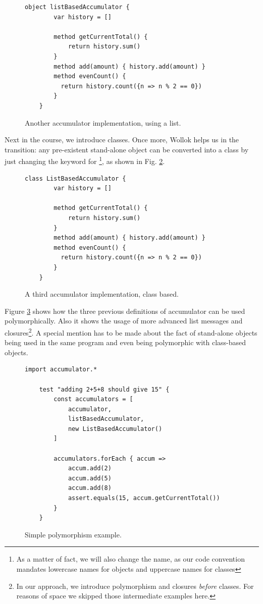 \begin{figure}[ht]
 \centering
 \begin{lstlisting}[language=Wollok]
	object listBasedAccumulator {
		var history = []
		
		method getCurrentTotal() { 
			return history.sum() 
		}
		method add(amount) { history.add(amount) }
		method evenCount() { 
		  return history.count({n => n % 2 == 0})
		}
	}
 \end{lstlisting}
 
 \caption{\small Another accumulator implementation, using a list.}
 \label{fig:accumulator/list}
\end{figure}

\medskip
Next in the course, we introduce classes.
Once more, Wollok helps us in the transition: any pre-existent stand-alone object can be converted into a class by just changing the keyword  for \footnote{As a matter of fact, we will also change the name, as our code convention mandates lowercase names for objects and uppercase names for classes}, as shown in Fig. \ref{fig:accumulator/classes}.

\begin{figure}[ht]
 \centering
 \begin{lstlisting}[language=Wollok]
	class ListBasedAccumulator {
		var history = []
		
		method getCurrentTotal() { 
			return history.sum() 
		}
		method add(amount) { history.add(amount) }
		method evenCount() { 
		  return history.count({n => n % 2 == 0})
		}
	}
 \end{lstlisting}
 
 \caption{\small A third accumulator implementation, class based.}
 \label{fig:accumulator/classes}
\end{figure}

\medskip
Figure \ref{fig:polymorphism} shows how the three previous definitions of accumulator can be used polymorphically. 
Also it shows the usage of more advanced list messages and closures\footnote{In our approach, we introduce polymorphism and closures \emph{before} classes. For reasons of space we skipped those intermediate examples here.}.
A special mention has to be made about the fact of stand-alone objects being used in the same program and even being polymorphic with class-based objects.

\begin{figure}[ht]
 \centering
 \begin{lstlisting}[language=Wollok]
 	import accumulator.*

	test "adding 2+5+8 should give 15" {
		const accumulators = [ 
			accumulator, 
			listBasedAccumulator,
			new ListBasedAccumulator()
		]

		accumulators.forEach { accum =>
			accum.add(2)
			accum.add(5)
			accum.add(8)
			assert.equals(15, accum.getCurrentTotal())	
		}
	}
 \end{lstlisting}
 
 \caption{\small Simple polymorphism example.}
 \label{fig:polymorphism}
\end{figure}


